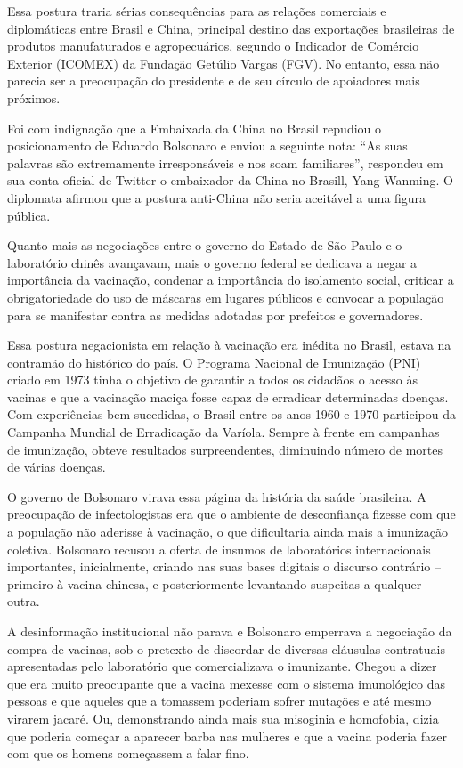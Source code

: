 Essa postura traria sérias consequências para as relações comerciais e
diplomáticas entre Brasil e China, principal destino das exportações
brasileiras de produtos manufaturados e agropecuários, segundo o
Indicador de Comércio Exterior (ICOMEX) da Fundação Getúlio Vargas
(FGV). No entanto, essa não parecia ser a preocupação do presidente e de
seu círculo de apoiadores mais próximos.

Foi com indignação que a Embaixada da China no Brasil repudiou o
posicionamento de Eduardo Bolsonaro e enviou a seguinte nota: ``As suas
palavras são extremamente irresponsáveis e nos soam familiares'',
respondeu em sua conta oficial de Twitter o embaixador da China no
Brasill, Yang Wanming. O diplomata afirmou que a postura anti-China não
seria aceitável a uma figura pública.

Quanto mais as negociações entre o governo do Estado de São Paulo e o
laboratório chinês avançavam, mais o governo federal se dedicava a negar
a importância da vacinação, condenar a importância do isolamento social,
criticar a obrigatoriedade do uso de máscaras em lugares públicos e
convocar a população para se manifestar contra as medidas adotadas por
prefeitos e governadores.

Essa postura negacionista em relação à vacinação era inédita no Brasil,
estava na contramão do histórico do país. O Programa Nacional de
Imunização (PNI) criado em 1973 tinha o objetivo de garantir a todos os
cidadãos o acesso às vacinas e que a vacinação maciça fosse capaz de
erradicar determinadas doenças. Com experiências bem-sucedidas, o Brasil
entre os anos 1960 e 1970 participou da Campanha Mundial de Erradicação
da Varíola. Sempre à frente em campanhas de imunização, obteve
resultados surpreendentes, diminuindo número de mortes de várias
doenças.

O governo de Bolsonaro virava essa página da história da saúde
brasileira. A preocupação de infectologistas era que o ambiente de
desconfiança fizesse com que a população não aderisse à vacinação, o que
dificultaria ainda mais a imunização coletiva. Bolsonaro recusou a
oferta de insumos de laboratórios internacionais importantes,
inicialmente, criando nas suas bases digitais o discurso contrário --
primeiro à vacina chinesa, e posteriormente levantando suspeitas a
qualquer outra.

A desinformação institucional não parava e Bolsonaro emperrava a
negociação da compra de vacinas, sob o pretexto de discordar de diversas
cláusulas contratuais apresentadas pelo laboratório que comercializava o
imunizante. Chegou a dizer que era muito preocupante que a vacina
mexesse com o sistema imunológico das pessoas e que aqueles que a
tomassem poderiam sofrer mutações e até mesmo virarem jacaré. Ou,
demonstrando ainda mais sua misoginia e homofobia, dizia que poderia
começar a aparecer barba nas mulheres e que a vacina poderia fazer com
que os homens começassem a falar fino.

